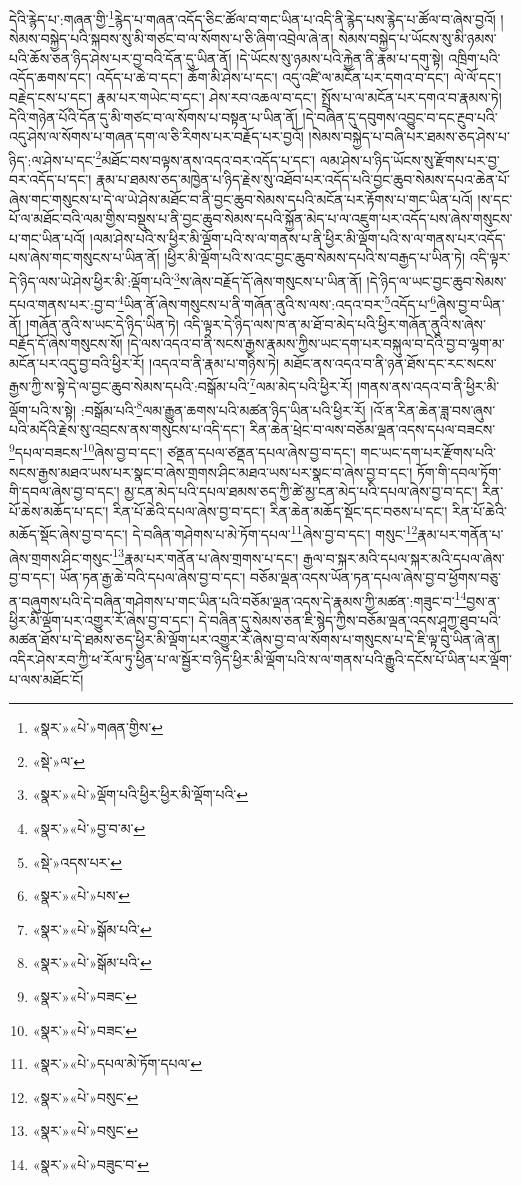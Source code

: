 དེའི་རྙེད་པ་:གཞན་གྱི་\footnote{«སྣར་»«པེ་»གཞན་གྱིས་}རྙེད་པ་གཞན་འདོད་ཅིང་ཚོལ་བ་གང་ཡིན་པ་འདི་ནི་རྙེད་པས་རྙེད་པ་ཚོལ་བ་ཞེས་བྱའོ། །སེམས་བསྐྱེད་པའི་སྐབས་སུ་མི་གཙང་བ་ལ་སོགས་པ་ཅི་ཞིག་འབྲེལ་ཞེ་ན། སེམས་བསྐྱེད་པ་ཡོངས་སུ་མི་ཉམས་པའི་ཆོས་ཅན་ཉིད་ཤེས་པར་བྱ་བའི་དོན་དུ་ཡིན་ནོ། །དེ་ཡོངས་སུ་ཉམས་པའི་རྐྱེན་ནི་རྣམ་པ་དགུ་སྟེ། འཁྲིག་པའི་འདོད་ཆགས་དང་། འདོད་པ་ཆེ་བ་དང་། ཆོག་མི་ཤེས་པ་དང་། འདུ་འཛི་ལ་མངོན་པར་དགའ་བ་དང་། ལེ་ལོ་དང་། བརྗེད་ངས་པ་དང་། རྣམ་པར་གཡེང་བ་དང་། ཤེས་རབ་འཆལ་བ་དང་། སྤྲོས་པ་ལ་མངོན་པར་དགའ་བ་རྣམས་ཏེ། དེའི་གཉེན་པོའི་དོན་དུ་མི་གཙང་བ་ལ་སོགས་པ་བསྟན་པ་ཡིན་ནོ། །དེ་བཞིན་དུ་དབུགས་འབྱུང་བ་དང་རྔུབ་པའི་འདུ་ཤེས་ལ་སོགས་པ་གཞན་དག་ལ་ཅི་རིགས་པར་བརྗོད་པར་བྱའོ། །སེམས་བསྐྱེད་པ་བཞི་པར་ཐམས་ཅད་ཤེས་པ་ཉིད་:ལ་ཤེས་པ་དང་\footnote{«སྡེ་»ལ་}མཐོང་བས་བལྟས་ནས་འདའ་བར་འདོད་པ་དང་། ལམ་ཤེས་པ་ཉིད་ཡོངས་སུ་རྫོགས་པར་བྱ་བར་འདོད་པ་དང་། རྣམ་པ་ཐམས་ཅད་མཁྱེན་པ་ཉིད་རྗེས་སུ་འཐོབ་པར་འདོད་པའི་བྱང་ཆུབ་སེམས་དཔའ་ཆེན་པོ་ཞེས་གང་གསུངས་པ་དེ་ལ་ཡེ་ཤེས་མཐོང་བ་ནི་བྱང་ཆུབ་སེམས་དཔའི་མངོན་པར་རྟོགས་པ་གང་ཡིན་པའོ། །ས་དང་པོ་ལ་མཐོང་བའི་ལམ་གྱིས་བསྡུས་པ་ནི་བྱང་ཆུབ་སེམས་དཔའི་སྐྱོན་མེད་པ་ལ་འཇུག་པར་འདོད་པས་ཞེས་གསུངས་པ་གང་ཡིན་པའོ། །ལམ་ཤེས་པའི་ས་ཕྱིར་མི་ལྡོག་པའི་ས་ལ་གནས་པ་ནི་ཕྱིར་མི་ལྡོག་པའི་ས་ལ་གནས་པར་འདོད་པས་ཞེས་གང་གསུངས་པ་ཡིན་ནོ། །ཕྱིར་མི་ལྡོག་པའི་ས་འང་བྱང་ཆུབ་སེམས་དཔའི་ས་བརྒྱད་པ་ཡིན་ཏེ། འདི་ལྟར་དེ་ཉིད་ལས་ཡེ་ཤེས་ཕྱིར་མི་:ལྡོག་པའི་\footnote{«སྣར་»«པེ་»ལྡོག་པའི་ཕྱིར་ཕྱིར་མི་ལྡོག་པའི་}ས་ཞེས་བརྗོད་དོ་ཞེས་གསུངས་པ་ཡིན་ནོ། །དེ་ཉིད་ལ་ཡང་བྱང་ཆུབ་སེམས་དཔའ་གནས་པར་:བྱ་བ་\footnote{«སྣར་»«པེ་»བྱ་བ་མ་}ཡིན་ནོ་ཞེས་གསུངས་པ་ནི་གཞོན་ནུའི་ས་ལས་:འདའ་བར་\footnote{«སྡེ་»འདས་པར་}འདོད་པ་\footnote{«སྣར་»«པེ་»པས་}ཞེས་བྱ་བ་ཡིན་ནོ། །གཞོན་ནུའི་ས་ཡང་དེ་ཉིད་ཡིན་ཏེ། འདི་ལྟར་དེ་ཉིད་ལས་ཁ་ན་མ་ཐོ་བ་མེད་པའི་ཕྱིར་གཞོན་ནུའི་ས་ཞེས་བརྗོད་དོ་ཞེས་གསུངས་སོ། །དེ་ལས་འདའ་བ་ནི་སངས་རྒྱས་རྣམས་ཀྱིས་ཡང་དག་པར་བསྐུལ་བ་དེའི་བྱ་བ་ལྷག་མ་མངོན་པར་འདུ་བྱ་བའི་ཕྱིར་རོ། །འདའ་བ་ནི་རྣམ་པ་གཉིས་ཏེ། མཐོང་ནས་འདའ་བ་ནི་ཉན་ཐོས་དང་རང་སངས་རྒྱས་ཀྱི་ས་སྟེ་དེ་ལ་བྱང་ཆུབ་སེམས་དཔའི་:བསྒོམ་པའི་\footnote{«སྣར་»«པེ་»སྒོམ་པའི་}ལམ་མེད་པའི་ཕྱིར་རོ། །གནས་ནས་འདའ་བ་ནི་ཕྱིར་མི་ལྡོག་པའི་ས་སྟེ། :བསྒོམ་པའི་\footnote{«སྣར་»«པེ་»སྒོམ་པའི་}ལམ་རྒྱུན་ཆགས་པའི་མཚན་ཉིད་ཡིན་པའི་ཕྱིར་རོ། །འོ་ན་རིན་ཆེན་ཟླ་བས་ཞུས་པའི་མདོའི་རྗེས་སུ་འབྲངས་ནས་གསུངས་པ་འདི་དང་། རིན་ཆེན་ཕྲེང་བ་ལས་བཅོམ་ལྡན་འདས་དཔལ་བཟངས་\footnote{«སྣར་»«པེ་»བཟང་}དཔལ་བཟངས་\footnote{«སྣར་»«པེ་»བཟང་}ཞེས་བྱ་བ་དང་། ཙནྡན་དཔལ་ཙནྡན་དཔལ་ཞེས་བྱ་བ་དང་། གང་ཡང་དག་པར་རྫོགས་པའི་སངས་རྒྱས་མཐའ་ཡས་པར་སྣང་བ་ཞེས་གྲགས་ཤིང་མཐའ་ཡས་པར་སྣང་བ་ཞེས་བྱ་བ་དང་། ཏོག་གི་དབལ་ཏོག་གི་དབལ་ཞེས་བྱ་བ་དང་། མྱ་ངན་མེད་པའི་དཔལ་ཐམས་ཅད་ཀྱི་ཚེ་མྱ་ངན་མེད་པའི་དཔལ་ཞེས་བྱ་བ་དང་། རིན་པོ་ཆེས་མཆོད་པ་དང་། རིན་པོ་ཆེའི་དཔལ་ཞེས་བྱ་བ་དང་། རིན་ཆེན་མཆོད་སྡོང་དང་བཅས་པ་དང་། རིན་པོ་ཆེའི་མཆོད་སྡོང་ཞེས་བྱ་བ་དང་། དེ་བཞིན་གཤེགས་པ་མེ་ཏོག་དཔལ་\footnote{«སྣར་»«པེ་»དཔལ་མེ་ཏོག་དཔལ་}ཞེས་བྱ་བ་དང་། གསུང་\footnote{«སྣར་»«པེ་»བསུང་}རྣམ་པར་གནོན་པ་ཞེས་གྲགས་ཤིང་གསུང་\footnote{«སྣར་»«པེ་»བསུང་}རྣམ་པར་གནོན་པ་ཞེས་གྲགས་པ་དང་། རྒྱལ་བ་སྐར་མའི་དཔལ་སྐར་མའི་དཔལ་ཞེས་བྱ་བ་དང་། ཡོན་ཏན་རྒྱ་ཆེ་བའི་དཔལ་ཞེས་བྱ་བ་དང་། བཅོམ་ལྡན་འདས་ཡོན་ཏན་དཔལ་ཞེས་བྱ་བ་ཕྱོགས་བཅུ་ན་བཞུགས་པའི་དེ་བཞིན་གཤེགས་པ་གང་ཡིན་པའི་བཅོམ་ལྡན་འདས་དེ་རྣམས་ཀྱི་མཚན་:གཟུང་བ་\footnote{«སྣར་»«པེ་»བཟུང་བ་}བྱས་ན་ཕྱིར་མི་ལྡོག་པར་འགྱུར་རོ་ཞེས་བྱ་བ་དང་། དེ་བཞིན་དུ་སེམས་ཅན་ཇི་སྙེད་ཀྱིས་བཅོམ་ལྡན་འདས་ཤཱཀྱ་ཐུབ་པའི་མཚན་ཐོས་པ་དེ་ཐམས་ཅད་ཕྱིར་མི་ལྡོག་པར་འགྱུར་རོ་ཞེས་བྱ་བ་ལ་སོགས་པ་གསུངས་པ་དེ་ཇི་ལྟ་བུ་ཡིན་ཞེ་ན། འདིར་ཤེས་རབ་ཀྱི་ཕ་རོལ་ཏུ་ཕྱིན་པ་ལ་སྦྱོར་བ་ཉིད་ཕྱིར་མི་ལྡོག་པའི་ས་ལ་གནས་པའི་རྒྱུའི་དངོས་པོ་ཡིན་པར་ལྡོག་པ་ལས་མཐོང་ངོ། 